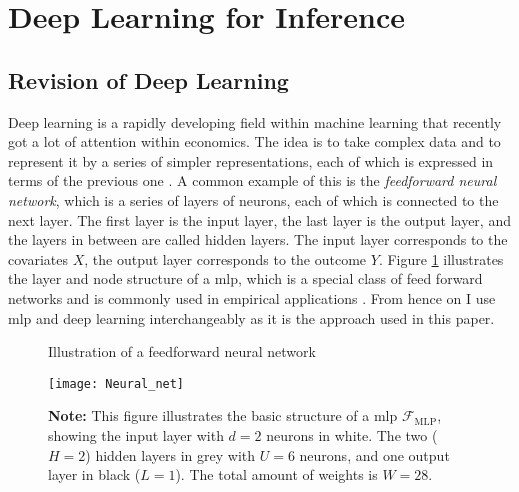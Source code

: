 \section{Deep Learning for Inference}

\subsection{Revision of Deep Learning}
Deep learning is a rapidly developing field within machine learning that recently got a lot of attention within economics.
The idea is to take complex data and to represent it by a series of simpler representations, each of which is expressed in terms of the previous one \citep{Goodfellow-et-al-2016}.
A common example of this is the \textit{feedforward neural network}, which is a series of layers of neurons, each of which is connected to the next layer.
The first layer is the input layer, the last layer is the output layer, and the layers in between are called hidden layers.
The input layer corresponds to the covariates $X$, the output layer corresponds to the outcome $Y$.
Figure \ref{fig:1} illustrates the layer and node structure of a \ac{mlp}, which is a special class of feed forward networks and is commonly used in empirical applications \citep{farrellDeepNeuralNetworks2021}.
From hence on I use \ac{mlp} and deep learning interchangeably as it is the approach used in this paper.

\begin{figure}%
\centering
\caption{Illustration of a feedforward neural network \citep{farrellDeepNeuralNetworks2021}}
\texttt{[image: Neural\_net]}
\caption*{\textbf{Note:} This figure illustrates the basic structure of a \ac{mlp} $\mathcal{F}_{\text{MLP}}$, showing the input layer with $d=2$ neurons in white. The two ($H=2$) hidden layers in grey with $U=6$ neurons, and one output layer in black ($L=1$). The total amount of weights is $W=28$.}
\label{fig:1}
\end{figure}

